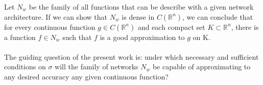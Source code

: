 \documentclass[../main.tex]{subfiles}
\begin{document}
	 \noindent Let $N_{w}$ be the family of all functions that can be describe with a given network architecture.  If we can show that $N_{w}$ is dense in $C(\mathbb{R}^n)$, we can conclude that for every continuous function $g \in C(\mathbb{R}^n) $ and each compact set $K \subset \mathbb{R}^n$, there is a function $f \in N_{w}$ such that $f$ is a good approximation to $g$ on K. \\ \\
	 \noindent The guiding question of the present work is: under which necessary and sufficient conditions on $\sigma$ will the family of networks $N_w$ be capable of approximating to any desired accuracy any given continuous function?
	 

 
	
\end{document}
